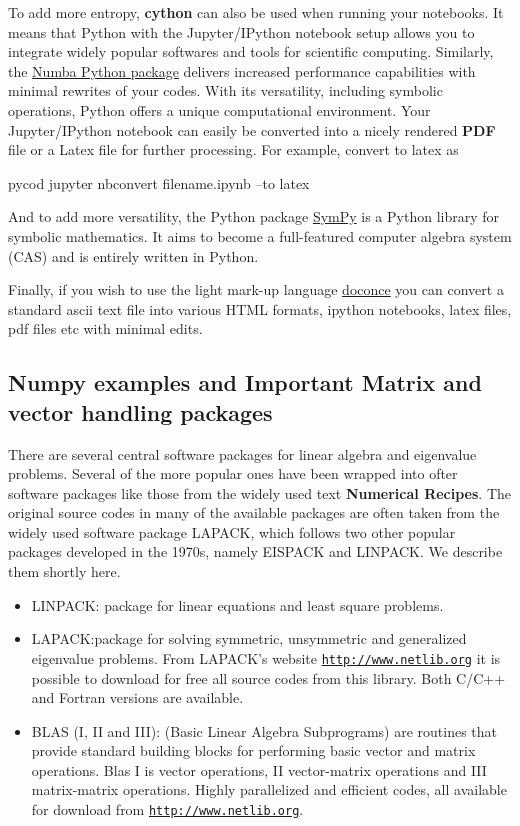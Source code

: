 \documentclass[%
oneside,                 %
final,                   %
10pt]{article}
\begin{document}
To add more entropy, \textbf{cython} can also be used when running your
notebooks. It means that Python with the Jupyter/IPython notebook
setup allows you to integrate widely popular softwares and tools for
scientific computing. Similarly, the 
\href{{https://numba.pydata.org/}}{Numba Python package} delivers increased performance
capabilities with minimal rewrites of your codes.  With its
versatility, including symbolic operations, Python offers a unique
computational environment. Your Jupyter/IPython notebook can easily be
converted into a nicely rendered \textbf{PDF} file or a Latex file for
further processing. For example, convert to latex as 

\bccq
pycod jupyter nbconvert filename.ipynb --to latex 
\eccq

And to add more versatility, the Python package \href{{http://www.sympy.org/en/index.html}}{SymPy} is a Python library for symbolic mathematics. It aims to become a full-featured computer algebra system (CAS)  and is entirely written in Python. 

Finally, if you wish to use the light mark-up language 
\href{{https://github.com/hplgit/doconce}}{doconce} you can convert a standard ascii text file into various HTML 
formats, ipython notebooks, latex files, pdf files etc with minimal edits.



\subsection{Numpy examples and Important Matrix and vector handling packages}

There are several central software packages for linear algebra and eigenvalue problems. Several of the more
popular ones have been wrapped into ofter software packages like those from the widely used text \textbf{Numerical Recipes}. The original source codes in many of the available packages are often taken from the widely used
software package LAPACK, which follows two other popular packages
developed in the 1970s, namely EISPACK and LINPACK.  We describe them shortly here.

\begin{itemize}
  \item LINPACK: package for linear equations and least square problems.

  \item LAPACK:package for solving symmetric, unsymmetric and generalized eigenvalue problems. From LAPACK's website \href{{http://www.netlib.org}}{\nolinkurl{http://www.netlib.org}} it is possible to download for free all source codes from this library. Both C/C++ and Fortran versions are available.

  \item BLAS (I, II and III): (Basic Linear Algebra Subprograms) are routines that provide standard building blocks for performing basic vector and matrix operations. Blas I is vector operations, II vector-matrix operations and III matrix-matrix operations. Highly parallelized and efficient codes, all available for download from \href{{http://www.netlib.org}}{\nolinkurl{http://www.netlib.org}}.
\end{itemize}
\end{document}
